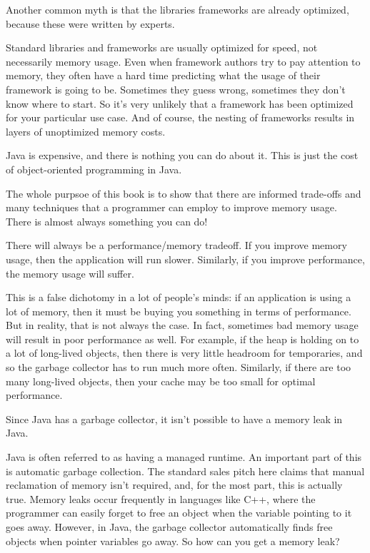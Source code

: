 {Another common myth is that the libraries frameworks are already optimized,
because these were written by experts.
} 

Standard libraries and frameworks are usually optimized for speed, not
necessarily memory usage. Even when framework authors try to pay attention to
memory, they often have a hard time predicting what the usage of their
framework is going to be. Sometimes they guess wrong, sometimes they don't know
where to start.  So it's very unlikely that a framework has been optimized for
your particular use case.  And of course, the nesting of frameworks results in
layers of unoptimized memory costs.

{Java is expensive, and there is nothing you can do about it.
This is just the cost of object-oriented programming in Java.
}

The whole purpsoe of this book is to show that there are informed trade-offs and
many techniques that a programmer can employ to improve memory usage. There is
almost always something you can do!

{There will always be a performance/memory tradeoff. If you improve memory
usage, then the application will run slower. 
Similarly, if you improve performance, the memory usage will suffer.
} 

This is a false dichotomy in a lot of people's minds: if an application is
using a lot of memory, then it must be buying you something in terms of performance. 
But in reality, that is not always the case. In fact, sometimes bad memory usage will
result in poor performance as well. For example, if 
the heap is holding on to a lot of long-lived objects, then there is very little
headroom for temporaries, and so the garbage collector has to run much more
often.  Similarly, if there are too many long-lived objects, then your cache may
be too small for optimal performance.

{Since Java has a garbage collector, it isn't possible
to have a memory leak in Java.
}

Java is often referred to as having a managed runtime. An important
part of this is automatic garbage collection. The standard sales pitch
here claims that manual reclamation of memory isn't required, and, for
the most part, this is actually true. Memory leaks occur frequently in
languages like C++, where the programmer can easily forget to free an
object when the variable pointing to it goes away.  However, in Java, the
garbage collector automatically finds free objects when pointer variables go
away. So how can you get a memory leak? 

